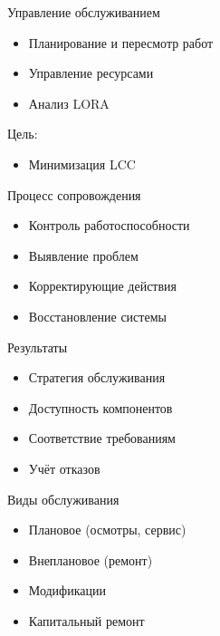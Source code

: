 \documentclass{beamer}
\begin{document}

\begin{frame}{Управление обслуживанием}
\begin{itemize}
    \item Планирование и пересмотр работ
    \item Управление ресурсами
    \item Анализ LORA
\end{itemize}

\vspace{0.5cm}

Цель:
\begin{itemize}
    \item Минимизация LCC
\end{itemize}

\end{frame}


\begin{frame}{Процесс сопровождения}
\begin{itemize}
    \item Контроль работоспособности
    \item Выявление проблем
    \item Корректирующие действия
    \item Восстановление системы
\end{itemize}

\end{frame}


\begin{frame}{Результаты}
\begin{itemize}
    \item Стратегия обслуживания
    \item Доступность компонентов
    \item Соответствие требованиям
    \item Учёт отказов
\end{itemize}

\end{frame}


\begin{frame}{Виды обслуживания}
\begin{itemize}
    \item Плановое (осмотры, сервис)
    \item Внеплановое (ремонт)
    \item Модификации
    \item Капитальный ремонт
\end{itemize}

\end{frame}
\end{document}
